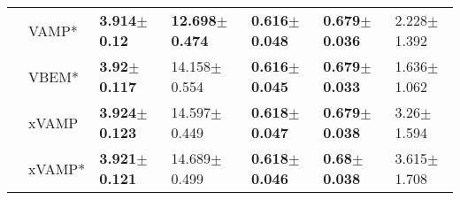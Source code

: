 \begin{tabular}{lllllll}
                 & VAMP* &   \textbf{3.914$\pm$0.12} &  \textbf{12.698$\pm$0.474} &  \textbf{0.616$\pm$0.048} &  \textbf{0.679$\pm$0.036} &           2.228$\pm$1.392 \\
                 & VBEM* &   \textbf{3.92$\pm$0.117} &           14.158$\pm$0.554 &  \textbf{0.616$\pm$0.045} &  \textbf{0.679$\pm$0.033} &           1.636$\pm$1.062 \\
                 & xVAMP &  \textbf{3.924$\pm$0.123} &           14.597$\pm$0.449 &  \textbf{0.618$\pm$0.047} &  \textbf{0.679$\pm$0.038} &            3.26$\pm$1.594 \\
                 & xVAMP* &  \textbf{3.921$\pm$0.121} &           14.689$\pm$0.499 &  \textbf{0.618$\pm$0.046} &   \textbf{0.68$\pm$0.038} &           3.615$\pm$1.708 \\
\bottomrule
\end{tabular}

